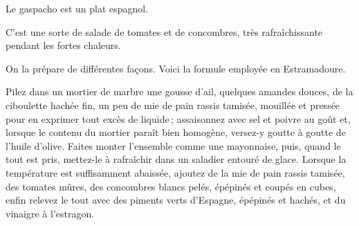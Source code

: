 Le gaspacho est un plat espagnol.

C'est une sorte de salade de tomates et de concombres, très rafraîchissante
pendant les fortes chaleurs.

On la prépare de différentes façons. Voici la formule employée en Estramadoure.

Pilez dans un mortier de marbre une gousse d'ail, quelques amandes douces, de
la ciboulette hachée fin, un peu de mie de pain rassis tamisée, mouillée et
pressée pour en exprimer tout excès de liquide ; assaisonnez avec sel et poivre
au goût et, lorsque le contenu du mortier paraît bien homogène, versez-y goutte
à goutte de l'huile d'olive. Faites monter l'ensemble comme une mayonnaise,
puis, quand le tout est pris, mettez-le à rafraîchir dans un saladier entouré
de glace. Lorsque la température est suffisamment abaissée, ajoutez de la mie
de pain rassis tamisée, des tomates mûres, des concombres blancs pelés,
épépinés et coupés en cubes, enfin relevez le tout avec des piments verts
d'Espagne, épépinés et hachés, et du vinaigre à l’estragon.
